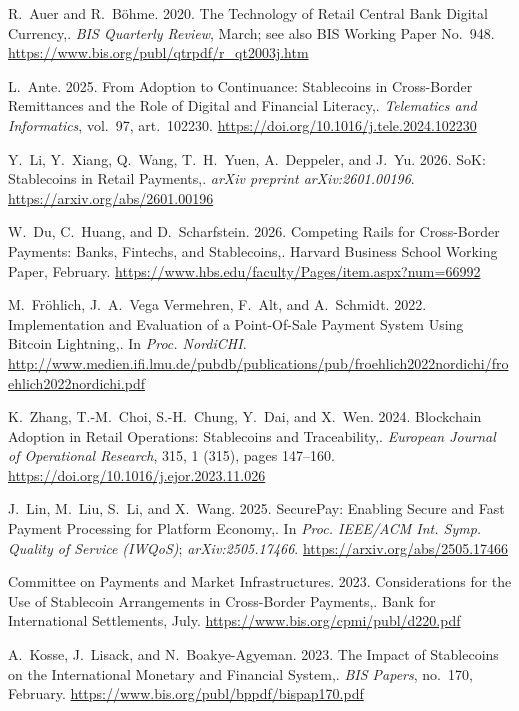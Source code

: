 {\begin{enumerate}[label={[\arabic*]}]
\item R.~Auer and R.~B\"{o}hme. 2020. The Technology of Retail Central Bank Digital Currency,. \emph{BIS Quarterly Review}, March; see also BIS Working Paper No.~948. \url{https://www.bis.org/publ/qtrpdf/r_qt2003j.htm}

\item L.~Ante. 2025. From Adoption to Continuance: Stablecoins in Cross-Border Remittances and the Role of Digital and Financial Literacy,. \emph{Telematics and Informatics}, vol.~97, art.~102230. \url{https://doi.org/10.1016/j.tele.2024.102230}

\item Y.~Li, Y.~Xiang, Q.~Wang, T.~H.~Yuen, A.~Deppeler, and J.~Yu. 2026. SoK: Stablecoins in Retail Payments,. \emph{arXiv preprint arXiv:2601.00196}. \url{https://arxiv.org/abs/2601.00196}

\item W.~Du, C.~Huang, and D.~Scharfstein. 2026. Competing Rails for Cross-Border Payments: Banks, Fintechs, and Stablecoins,. Harvard Business School Working Paper, February. \url{https://www.hbs.edu/faculty/Pages/item.aspx?num=66992}

\item M.~Fr\"{o}hlich, J.~A.~Vega Vermehren, F.~Alt, and A.~Schmidt. 2022. Implementation and Evaluation of a Point-Of-Sale Payment System Using Bitcoin Lightning,. In \emph{Proc. NordiCHI}. \url{http://www.medien.ifi.lmu.de/pubdb/publications/pub/froehlich2022nordichi/froehlich2022nordichi.pdf}

\item K.~Zhang, T.-M.~Choi, S.-H.~Chung, Y.~Dai, and X.~Wen. 2024. Blockchain Adoption in Retail Operations: Stablecoins and Traceability,. \emph{European Journal of Operational Research}, 315, 1 (315), pages 147--160. \url{https://doi.org/10.1016/j.ejor.2023.11.026}

\item J.~Lin, M.~Liu, S.~Li, and X.~Wang. 2025. SecurePay: Enabling Secure and Fast Payment Processing for Platform Economy,. In \emph{Proc. IEEE/ACM Int. Symp. Quality of Service (IWQoS)}; \emph{arXiv:2505.17466}. \url{https://arxiv.org/abs/2505.17466}

\item Committee on Payments and Market Infrastructures. 2023. Considerations for the Use of Stablecoin Arrangements in Cross-Border Payments,. Bank for International Settlements, July. \url{https://www.bis.org/cpmi/publ/d220.pdf}

\item A.~Kosse, J.~Lisack, and N.~Boakye-Agyeman. 2023. The Impact of Stablecoins on the International Monetary and Financial System,. \emph{BIS Papers}, no.~170, February. \url{https://www.bis.org/publ/bppdf/bispap170.pdf}


\end{enumerate}}
